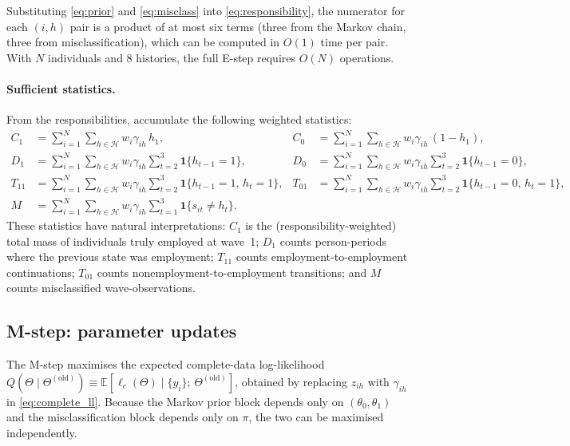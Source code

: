 \documentclass[12pt]{article}
\begin{document}
Substituting \eqref{eq:prior} and \eqref{eq:misclass} into
\eqref{eq:responsibility}, the numerator for each \((i, h)\) pair is a
product of at most six terms (three from the Markov chain, three from
misclassification), which can be computed in \(O(1)\) time per pair.
With \(N\) individuals and 8 histories, the full E-step requires
\(O(N)\) operations.

\paragraph{Sufficient statistics.}
From the responsibilities, accumulate the following weighted statistics:
\begin{align}
C_1 &= \sum_{i=1}^{N} \sum_{h \in \mathcal{H}} w_i \gamma_{ih}\, h_1,
  &C_0 &= \sum_{i=1}^{N} \sum_{h \in \mathcal{H}} w_i \gamma_{ih}\,(1 - h_1),
  \label{eq:suff_C} \\[4pt]
D_1 &= \sum_{i=1}^{N} \sum_{h \in \mathcal{H}} w_i \gamma_{ih}
  \sum_{t=2}^{3} \mathbf{1}\{h_{t-1} = 1\},
  &D_0 &= \sum_{i=1}^{N} \sum_{h \in \mathcal{H}} w_i \gamma_{ih}
  \sum_{t=2}^{3} \mathbf{1}\{h_{t-1} = 0\},
  \label{eq:suff_D} \\[4pt]
T_{11} &= \sum_{i=1}^{N} \sum_{h \in \mathcal{H}} w_i \gamma_{ih}
  \sum_{t=2}^{3} \mathbf{1}\{h_{t-1} = 1,\, h_t = 1\},
  &T_{01} &= \sum_{i=1}^{N} \sum_{h \in \mathcal{H}} w_i \gamma_{ih}
  \sum_{t=2}^{3} \mathbf{1}\{h_{t-1} = 0,\, h_t = 1\},
  \label{eq:suff_T} \\[4pt]
M &= \sum_{i=1}^{N} \sum_{h \in \mathcal{H}} w_i \gamma_{ih}
  \sum_{t=1}^{3} \mathbf{1}\{s_{it} \neq h_t\}.
  \label{eq:suff_M}
\end{align}
These statistics have natural interpretations: \(C_1\) is the
(responsibility-weighted) total mass of individuals truly employed at
wave~1; \(D_1\) counts person-periods where the previous state was
employment; \(T_{11}\) counts employment-to-employment continuations;
\(T_{01}\) counts nonemployment-to-employment transitions; and \(M\)
counts misclassified wave-observations.

\subsection{M-step: parameter updates}
\label{sec:mstep}

The M-step maximises the expected complete-data log-likelihood
\(Q(\Theta \mid \Theta^{(\text{old})}) \equiv
\mathbb{E}[\ell_c(\Theta) \mid \{y_i\};\, \Theta^{(\text{old})}]\),
obtained by replacing \(z_{ih}\) with \(\gamma_{ih}\) in
\eqref{eq:complete_ll}. Because the Markov prior block depends only on
\((\theta_0, \theta_1)\) and the misclassification block depends only on
\(\pi\), the two can be maximised independently.
\end{document}
